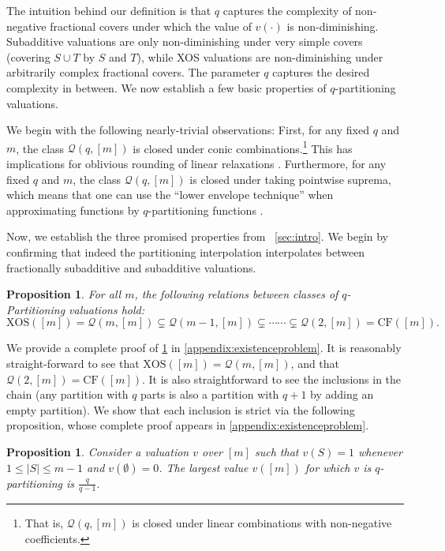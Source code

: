 \documentclass[11pt]{article}%
\newtheorem{proposition}[theorem]{Proposition}
\numberwithin{theorem}{subsection}
\newcommand{\classqm}{\mathcal{Q}(q,[m])}
\begin{document}
The intuition behind our definition is that $q$ captures the complexity of non-negative fractional covers under which the value of $v(\cdot)$ is non-diminishing. Subadditive valuations are only non-diminishing under very simple covers (covering $S\cup T$ by $S$ and $T$), while XOS valuations are non-diminishing under arbitrarily complex fractional covers. The parameter $q$ captures the desired complexity in between. We now establish a few basic properties of $q$-partitioning valuations.

We begin with the following nearly-trivial observations: First, for any fixed $q$ and $m$, the class $\classqm$ is closed under conic combinations.\footnote{That is, $\classqm$ is closed under linear combinations with non-negative coefficients.} This has 
implications for oblivious rounding of linear relaxations \cite{FeigeFT16}. Furthermore, for any fixed $q$ and $m$, the class $\classqm$ is closed under taking pointwise suprema, which means that one can use the ``lower envelope technique'' when approximating functions by $q$-partitioning functions \cite[Section 3.1]{FeigeFIILS15}. 

Now, we establish the three promised properties from ~\cref{sec:intro}. We begin by confirming that indeed the partitioning interpolation interpolates between fractionally subadditive and subadditive valuations.

\begin{proposition}
\label{prop:exisetnce}
For all $m$, the following relations between classes of $q$-Partitioning valuations hold:
$$
\text{XOS}([m]) = 
\mathcal{Q}(m, [m])\subsetneq 
\mathcal{Q}(m-1, [m])\subsetneq \cdots
\cdots \subsetneq
\mathcal{Q}(2, [m])
= \text{CF}([m]).
$$
\end{proposition}

We provide a complete proof of \cref{prop:exisetnce} in \cref{appendix:existenceproblem}. It is reasonably straight-forward to see that $\text{XOS}([m]) = 
\mathcal{Q}(m, [m])$, and that $\mathcal{Q}(2, [m])
= \text{CF}([m])$. It is also straightforward to see the inclusions in the chain (any partition with $q$ parts is also a partition with $q+1$ by adding an empty partition). We show that each inclusion is strict via the following proposition, whose complete proof appears in \cref{appendix:existenceproblem}.

\begin{proposition}
\label{prop:existenceproblem}
Consider a valuation $v$ over $[m]$ such that $v(S) = 1$ whenever $1 \le |S|\le m-1$ and $v(\emptyset) = 0$. The largest value $v([m])$ for which $v$ is $q$-partitioning is $\frac{q}{q-1}.$
\end{proposition}
\end{document}
